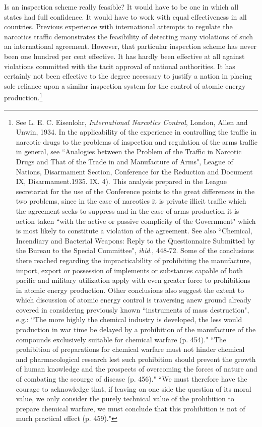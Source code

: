 Is an inspection scheme really feasible? It would have to be one in which all states had full confidence. It would have to work with equal effectiveness in all countries. Previous experience with international attempts to regulate the narcotics traffic demonstrates the feasibility of detecting many violations of such an international agreement. However, that particular inspection scheme has never been one hundred per cent effective. It has hardly been effective at all against violations committed with the tacit approval of national authorities. It has certainly not been effective to the degree necessary to justify a nation in placing sole reliance upon a similar inspection system for the control of atomic energy production.\footnote{See L. E. C. Eisenlohr, \textit{International Narcotics Control}, London, Allen and Unwin, 1934. In the applicability of the experience in controlling the traffic in narcotic drugs to the problems of inspection and regulation of the arms traffic in general, see ``Analogies between the Problem of the Traffic in Narcotic Drugs and That of the Trade in and Manufacture of Arms", League of Nations, Disarmament Section, Conference for the Reduction and Document IX, Disarmament.1935. IX. 4). This analysis prepared in the League secretariat for the use of the Conference points to the great differences in the two problems, since in the case of narcotics it is private illicit traffic which the agreement seeks to suppress and in the case of arms production it is action taken ``with the active or passive complicity of the Government" which is most likely to constitute a violation of the agreement. See also ``Chemical, Incendiary and Bacterial Weapons: Reply to the Questionnaire Submitted by the Bureau to the Special Committee", \textit{ibid}., 448-72. Some of the conclusions there reached regarding the impracticability of prohibiting the manufacture, import, export or possession of implements or substances capable of both pacific and military utilization apply with even greater force to prohibitions in atomic energy production. Other conclusions also suggest the extent to which discussion of atomic energy control is traversing anew ground already covered in considering previously known ``instruments of mass destruction", e.g.: ``The more highly the chemical industry is developed, the less would production in war time be delayed by a prohibition of the manufacture of the compounds exclusively suitable for chemical warfare (p. 454)." ``The prohibition of preparations for chemical warfare must not hinder chemical and pharmacological research lest such prohibition should prevent the growth of human knowledge and the prospects of overcoming the forces of nature and of combating the scourge of disease (p. 456)." ``We must therefore have the courage to acknowledge that, if leaving on one side the question of its moral value, we only consider the purely technical value of the prohibition to prepare chemical warfare, we must conclude that this prohibition is not of much practical effect (p. 459)."}

